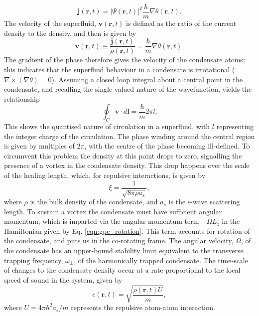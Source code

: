 \begin{equation}
\textbf{j}(\textbf{r},t) = \vert\Psi(\textbf{r},t)\vert ^2\frac{\hbar}{m}\nabla\theta(\textbf{r},t).
\end{equation}
The velocity of the superfluid, $\textbf{v}(\textbf{r},t)$ is defined as the ratio of the current density to the density, and then is given by
\begin{equation}\label{eqn:velocity}
\textbf{v}(\textbf{r},t)\equiv \frac{\textbf{j}(\textbf{r},t)}{\rho(\textbf{r},t)} = \frac{\hbar}{m}\nabla\theta(\textbf{r},t).
\end{equation}
The gradient of the phase therefore gives the velocity of the condensate atoms; this indicates that the superfluid behaviour in a condensate is irrotational ($\nabla\times(\nabla\theta) =0$). Assuming a closed loop integral about a central point in the condensate, and recalling the single-valued nature of the wavefunction, yields the relationship
\begin{equation}\label{eqn:circulation}
\oint_C \textbf{v}\cdot d\textbf{l} = \frac{\hbar}{m}2\pi l.
\end{equation}
This shows the quantised nature of circulation in a superfluid, with $l$ representing the integer charge of the circulation. The phase winding around the central region is given by multiples of $2\pi$, with the centre of the phase becoming ill-defined. To circumvent this problem the density at this point drops to zero, signalling the presence of a vortex in the condensate density. This drop happens over the scale of the healing length, which, for repulsive interactions, is given by
\begin{equation}
\xi = \frac{1}{\sqrt{8\pi \rho a_s}},
\end{equation}
where $\rho$ is the bulk density of the condensate, and $a_s$ is the s-wave scattering length. To sustain a vortex the condensate must have sufficient angular momentum, which is imparted via the angular momentum term $-\Omega L_z$ in the Hamiltonian given by Eq. \eqref{eqn:gpe_rotation}. This term accounts for rotation of the condensate, and puts us in the co-rotating frame. The angular velocity, $\Omega$, of the condensate has an upper-bound stability limit equivalent to the transverse trapping frequency, $\omega_{\perp}$, of the harmonically trapped condensate. The time-scale of changes to the condensate density occur at a rate proportional to the local speed of sound in the system, given by
\begin{equation}
c(\textbf{r},t) = \sqrt{\frac{\rho (\textbf{r},t) U}{m}},
\end{equation}
where $U=4\pi\hbar^2 a_s/m$ represents the repulsive atom-atom interaction.

